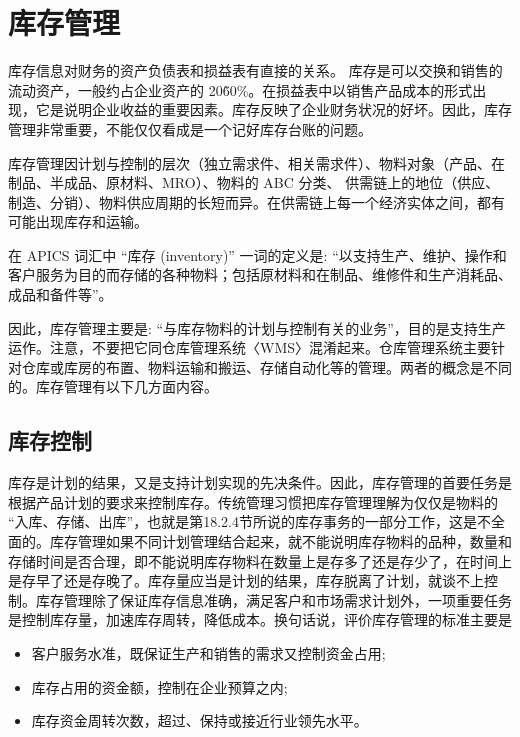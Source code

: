 \section {库存管理}

    库存信息对财务的资产负债表和损益表有直接的关系。 库存是可以交换和销售的流动资产，一般约占企业资产的 20\~60\%。在损益表中以销售产品成本的形式出现，它是说明企业收益的重要因素。库存反映了企业财务状况的好坏。因此，库存管理非常重要，不能仅仅看成是一个记好库存台账的问题。

    库存管理因计划与控制的层次（独立需求件、相关需求件）、物料对象（产品、在制品、半成品、原材料、MRO）、物料的 ABC 分类、 供需链上的地位（供应、制造、分销）、物料供应周期的长短而异。在供需链上每一个经济实体之间，都有可能出现库存和运输。

    在 APICS 词汇中 “库存 (inventory)” 一词的定义是: “以支持生产、维护、操作和客户服务为目的而存储的各种物料；包括原材料和在制品、维修件和生产消耗品、成品和备件等”。

    因此，库存管理主要是: “与库存物料的计划与控制有关的业务”，目的是支持生产运作。注意，不要把它同仓库管理系统〈WMS〉混淆起来。仓库管理系统主要针对仓库或库房的布置、物料运输和搬运、存储自动化等的管理。两者的概念是不同的。库存管理有以下几方面内容。

\subsection {库存控制}

    库存是计划的结果，又是支持计划实现的先决条件。因此，库存管理的首要任务是根据产品计划的要求来控制库存。传统管理习惯把库存管理理解为仅仅是物料的 “入库、存储、出库”，也就是第18.2.4节所说的库存事务的一部分工作，这是不全面的。库存管理如果不同计划管理结合起来，就不能说明库存物料的品种，数量和存储时间是否合理，即不能说明库存物料在数量上是存多了还是存少了，在时间上是存早了还是存晚了。库存量应当是计划的结果，库存脱离了计划，就谈不上控制。库存管理除了保证库存信息准确，满足客户和市场需求计划外，一项重要任务是控制库存量，加速库存周转，降低成本。换句话说，评价库存管理的标准主要是

    \begin{itemize}
        \item 客户服务水准，既保证生产和销售的需求又控制资金占用;

        \item 库存占用的资金额，控制在企业预算之内;

        \item 库存资金周转次数，超过、保持或接近行业领先水平。
    \end{itemize}

